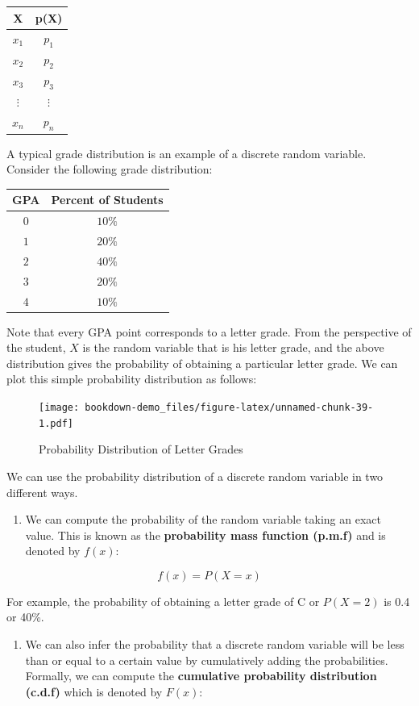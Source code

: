 \documentclass[]{book}
\providecommand{\tightlist}{%
  \setlength{\itemsep}{0pt}\setlength{\parskip}{0pt}}
\theoremstyle{definition}
\theoremstyle{definition}
\theoremstyle{definition}
\theoremstyle{remark}
\let\BeginKnitrBlock\begin \let\EndKnitrBlock\end
\begin{document}
\begin{longtable}[]{@{}cc@{}}
\toprule
X & p(X)\tabularnewline
\midrule
\endhead
\(x_1\) & \(p_1\)\tabularnewline
\(x_2\) & \(p_2\)\tabularnewline
\(x_3\) & \(p_3\)\tabularnewline
\(\vdots\) & \(\vdots\)\tabularnewline
\(x_n\) & \(p_n\)\tabularnewline
\bottomrule
\end{longtable}

\BeginKnitrBlock{example}[Grade Distribution]
\protect\hypertarget{exm:unnamed-chunk-38}{}{\label{exm:unnamed-chunk-38} {} }A typical grade distribution is an example of a discrete random variable. Consider the following grade distribution:

\begin{longtable}[]{@{}cc@{}}
\toprule
GPA & Percent of Students\tabularnewline
\midrule
\endhead
\(0\) & \(10\%\)\tabularnewline
\(1\) & \(20\%\)\tabularnewline
\(2\) & \(40\%\)\tabularnewline
\(3\) & \(20\%\)\tabularnewline
\(4\) & \(10\%\)\tabularnewline
\bottomrule
\end{longtable}
\EndKnitrBlock{example}

Note that every GPA point corresponds to a letter grade. From the perspective of the student, \(X\) is the random variable that is his letter grade, and the above distribution gives the probability of obtaining a particular letter grade. We can plot this simple probability distribution as follows:

\begin{figure}
\centering
\texttt{[image: bookdown-demo\_files/figure-latex/unnamed-chunk-39-1.pdf]}
\caption{\label{fig:unnamed-chunk-39}Probability Distribution of Letter Grades}
\end{figure}

We can use the probability distribution of a discrete random variable in two different ways.

\begin{enumerate}
\def\labelenumi{\arabic{enumi}.}
\tightlist
\item
  We can compute the probability of the random variable taking an exact value. This is known as the \textbf{probability mass function (p.m.f)} and is denoted by \(f(x)\):
\end{enumerate}

\[f(x)=P(X=x)\]

For example, the probability of obtaining a letter grade of C or \(P(X=2)\) is 0.4 or 40\%.

\begin{enumerate}
\def\labelenumi{\arabic{enumi}.}
\setcounter{enumi}{1}
\tightlist
\item
  We can also infer the probability that a discrete random variable will be less than or equal to a certain value by cumulatively adding the probabilities. Formally, we can compute the \textbf{cumulative probability distribution (c.d.f)} which is denoted by \(F(x)\):
\end{enumerate}
\end{document}
